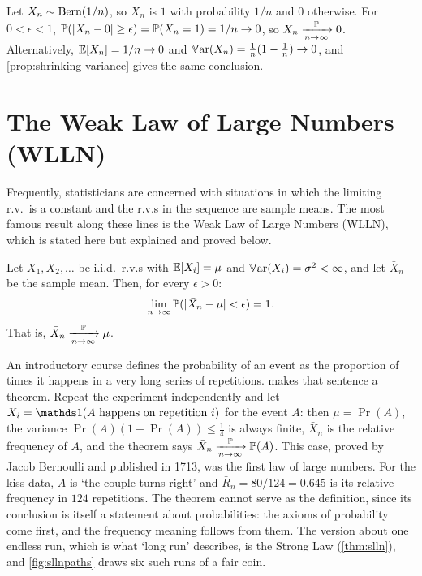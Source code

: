 \begin{example}
\label{ex:bern-1-over-n}
Let $X_n \sim \text{Bern}(1/n)$, so $X_n$ is $1$ with probability $1/n$ and $0$ otherwise.
For $0 < \epsilon < 1$, $\mathbb{P}(\lvert X_n - 0\rvert \geq \epsilon) = \mathbb{P}(X_n = 1) = 1/n \to 0$, so $X_n \xrightarrow [n \to \infty ]{\mathbb{P}} 0$.
Alternatively, $\operatorname*{\mathbb{E}}[X_n] = 1/n \to 0$ and $\operatorname*{\mathbb{V}\text{ar}}(X_n) = \frac{1}{n}(1 - \frac{1}{n}) \to 0$, and \cref{prop:shrinking-variance} gives the same conclusion.
\end{example}

\section{The Weak Law of Large Numbers (WLLN)}
\label{sec:wlln}

Frequently, statisticians are concerned with situations in which the limiting r.v.\ is a constant and the r.v.s in the sequence are sample means.
The most famous result along these lines is the Weak Law of Large Numbers (WLLN), which is stated here but explained and proved below.

\begin{theorem}
\label{thm:wlln}
Let $X_1, X_2, \ldots$ be i.i.d.\ r.v.s with $\operatorname*{\mathbb{E}}[X_i] = \mu$ and $\operatorname*{\mathbb{V}\text{ar}}(X_i) = \sigma^2 < \infty$, and let $\bar{X}_n$ be the sample mean.
Then, for every $\epsilon > 0$:
\[
\lim_{n \to \infty} \mathbb{P}(\lvert\bar{X}_n - \mu\rvert < \epsilon) = 1.
\]
That is, $\bar{X}_n \xrightarrow [n \to \infty ]{\mathbb{P}} \mu$.
\end{theorem}

\begin{bridge}
An introductory course defines the probability of an event as the proportion of times it happens in a very long series of repetitions.
 makes that sentence a theorem.
Repeat the experiment independently and let $X_i = \ind(A \text{ happens on repetition } i)$ for the event $A$: then $\mu = \Pr(A)$, the variance $\Pr(A)(1 - \Pr(A)) \leq \frac14$ is always finite, $\bar{X}_n$ is the relative frequency of $A$, and the theorem says $\bar{X}_n \xrightarrow [n \to \infty ]{\mathbb{P}} \mathbb{P}(A)$.
This case, proved by Jacob Bernoulli and published in 1713, was the first law of large numbers.
For the kiss data, $A$ is `the couple turns right' and $\bar{R}_n = 80/124 = 0.645$ is its relative frequency in $124$ repetitions.
The theorem cannot serve as the definition, since its conclusion is itself a statement about probabilities: the axioms of probability come first, and the frequency meaning follows from them.
The version about one endless run, which is what `long run' describes, is the Strong Law (\cref{thm:slln}), and \cref{fig:sllnpaths} draws six such runs of a fair coin.
\end{bridge}

